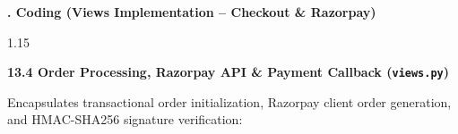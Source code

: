 \documentclass[12pt,a4paper]{article}
\begin{document}
\vfill

\newpage



\noindent
{\color{bcetblue}\textbf{\fontsize{14}{18}. Coding (Views Implementation -- Checkout \& Razorpay)}}

\vspace{0.08in}

{\fontsize{13}{18}\selectfont
\begin{spacing}{1.15}

\noindent
\textbf{13.4 Order Processing, Razorpay API \& Payment Callback (\texttt{views.py})}

\vspace{0.04in}

\noindent
{\fontsize{11}{14}\selectfont Encapsulates transactional order initialization, Razorpay client order generation, and HMAC-SHA256 signature verification:}

\end{spacing}
}

\vspace{0.06in}
\end{document}
